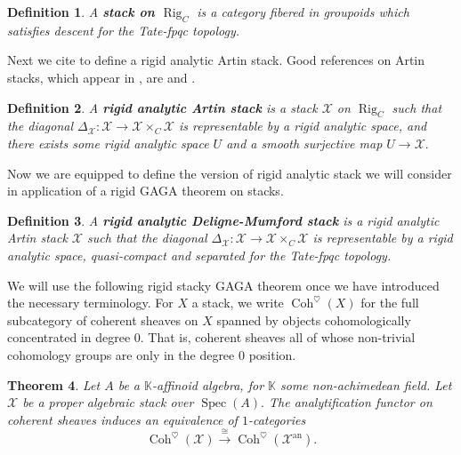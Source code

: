 \documentclass[11pt]{amsart}
\newtheorem{theorem}{Theorem}[section]
\newtheorem{definition}[theorem]{Definition}
\theoremstyle{definition}
\numberwithin{equation}{section}
\newcommand{\Spec}{\operatorname{Spec}} 	%
\newcommand{\sX}{\mathscr{X}}		%
\newcommand{\bbK}{\mathbb{K}}		%
\begin{document}
		\begin{definition}
			A \textbf{stack on $\operatorname{Rig}_C$} is a category fibered in groupoids which satisfies descent for the Tate-fpqc topology. 
		\end{definition}
		
		Next we cite \cite{Emerton-Gee-Hellman-categorical-p-adic-langlands} to define a rigid analytic Artin stack. Good references on Artin stacks, which appear in \cite{Artin-versal-deformations-algebraic-stacks}, are  \cite{Abramovich-Olsson-Vistoli-tame-stacks-pos-characteristic} and \cite{Abramovich-Olsson-Vistoli-twisted-stable-maps-tame-Artin-stacks}.
		
		\begin{definition}\cite[$5.1.10$]{Emerton-Gee-Hellman-categorical-p-adic-langlands}
			A \textbf{rigid analytic Artin stack} is a stack $\sX$ on $\operatorname{Rig}_C$ such that the diagonal $\Delta_{\sX}:\sX\to \sX\times_C \sX$ is representable by a rigid analytic space, and there exists some rigid analytic space $U$ and a smooth surjective map $U\to \sX.$
		\end{definition}
		
		Now we are equipped to define the version of rigid analytic stack we will consider in application of a rigid GAGA theorem on stacks. 
		
		\begin{definition}
			\label{def: rigid analytic DM stack v2}
			A \textbf{rigid analytic Deligne-Mumford stack} is a rigid analytic Artin stack $\sX$ such that the diagonal $\Delta_{\sX}:\sX\to \sX\times_C\sX$ is representable by a rigid analytic space, quasi-compact and separated for the Tate-fpqc topology. 
		\end{definition}
		
		We will use the following rigid stacky GAGA theorem once we have introduced the necessary terminology. For $X$ a stack, we write $\operatorname{Coh}^{\heartsuit}(X)$ for the full subcategory of coherent sheaves on $X$ spanned by objects cohomologically concentrated in degree $0.$ That is, coherent sheaves all of whose non-trivial cohomology groups are only in the degree $0$ position.
		
		\begin{theorem}\cite[$7.4$]{Porta-Yu-Higher-analytic-stacks-GAGA}
			Let $A$ be a $\bbK$-affinoid algebra, for $\bbK$ some non-achimedean field. Let $\sX$ be a proper algebraic stack over $\Spec(A).$ The analytification functor on coherent sheaves induces an equivalence of $1$-categories
			\[\operatorname{Coh}^{\heartsuit}(\sX)\overset{\cong}{\to} \operatorname{Coh}^{\heartsuit}(\sX^{\text{an}}).\] 
		\end{theorem}
		
\end{document}
